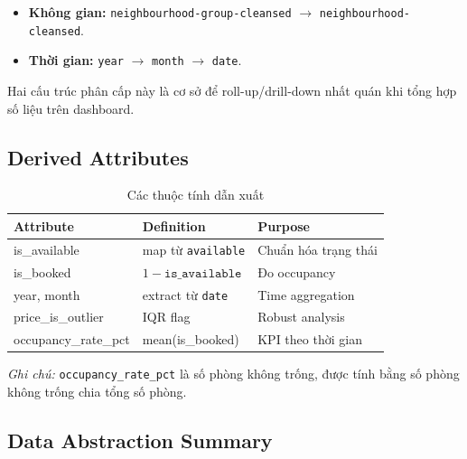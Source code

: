 \begin{itemize}
    \item \textbf{Không gian:} \texttt{neighbourhood-group-cleansed} $\rightarrow$ \texttt{neighbourhood-cleansed}.
    \item \textbf{Thời gian:} \texttt{year} $\rightarrow$ \texttt{month} $\rightarrow$ \texttt{date}.
\end{itemize}

Hai cấu trúc phân cấp này là cơ sở để roll-up/drill-down nhất quán khi tổng hợp số liệu trên dashboard.

\subsection{Derived Attributes}

\begin{table}[htbp]
\centering
\caption{Các thuộc tính dẫn xuất}
\begin{tabularx}{\textwidth}{@{} l l X @{}}
\toprule
\textbf{Attribute} & \textbf{Definition} & \textbf{Purpose} \\
\midrule
is\_available        & map từ \texttt{available}     & Chuẩn hóa trạng thái \\ \hline
is\_booked           & $1 - \texttt{is\_available}$  & Đo occupancy \\ \hline
year, month          & extract từ \texttt{date}      & Time aggregation \\ \hline
price\_is\_outlier   & IQR flag                      & Robust analysis \\ \hline
occupancy\_rate\_pct & mean(is\_booked)              & KPI theo thời gian \\
\bottomrule
\end{tabularx}
\end{table}

\textit{Ghi chú:} \texttt{occupancy\_rate\_pct} là số phòng không trống, được tính bằng số phòng không trống chia tổng số phòng.

\subsection{Data Abstraction Summary}

